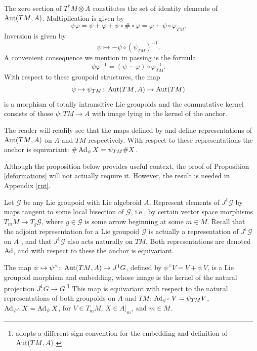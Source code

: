 \documentclass[leqno,12pt]{amsart} %
\newcommand{\varcheck}[1]{{#1^\wedge}} \newcommand{\model}{\automorphism({TM},A)}
\begin{document}
The zero section of $T^*\!M \otimes A$ constitutes the set of identity elements of
$\model$. Multiplication is given by
\begin{equation}
  \label{clost}
  \psi \varphi = \psi + \varphi + \psi \circ \# \circ \varphi = \varphi + \psi \circ \varphi_{TM}.
\end{equation}
Inversion is given by
\begin{equation*}
  \psi \mapsto  -\psi \circ (\psi_{TM})^{-1}.
\end{equation*}
A convenient consequence we mention in passing is the formula
\begin{equation}
  \label{clost2}
  \psi \varphi^{-1} = (\psi - \varphi)\circ \varphi_{TM}^{-1}.
\end{equation}
With respect to these groupoid structures, the map
$$\psi \mapsto \psi_{TM} \colon \model \rightarrow
\automorphism({TM})$$ is a morphism of totally intransitive Lie groupoids and the
commutative kernel consists of those $\psi \colon TM \rightarrow A$ with image lying in
the kernel of the anchor.

The reader will readily see that the maps defined by  and
 define representations of $\model$ on $A$ and $TM$ respectively.
With respect to these representations the anchor is equivariant:
$\#\operatorname{Ad}_\psi X = \psi_{TM}\#X$.

Although the proposition below provides useful context, the proof of Proposition
\ref{deformations} will not actually require it. However, the result is needed in Appendix
\ref{rut}.

Let ${\mathcal G} $ be any Lie groupoid with Lie algebroid $A$. Represent elements of
$J^1 {\mathcal G} $ by maps tangent to some local bisection of ${\mathcal G} $, i.e., by
certain vector space morphisms $T_{m}M \rightarrow T_g {\mathcal G} $, where
$g \in {\mathcal G} $ is some arrow beginning at some $m \in M$. Recall that the adjoint
representation for a Lie groupoid ${\mathcal G} $ is actually a representation of
$J^1 {\mathcal G} $ on $A$ \cite{Blaom_16b}, and that $J^1 {\mathcal G} $ also acts
naturally on $TM$. Both representations are denoted $\operatorname{Ad}$, and with respect to these
the anchor is equivariant.

\begin{proposition}
  The map $\psi \mapsto \varcheck \psi \colon \model \rightarrow J^1 G$, defined by
  $\varcheck \psi V = V + \psi\,V$, is a Lie groupoid morphism and embedding, whose image
  is the kernel of the natural projection $J^1 G \rightarrow G$.\footnote{\cite{Blaom_16b}
    adopts a different sign convention for the embedding and definition of $\model$.} This
  map is equivariant with respect to the natural representations of both groupoids on $A$
  and $TM$: $\Adjoint_{\varcheck\psi} V = \psi_{TM}V$,
  $\Adjoint_{\varcheck\psi} X = \Adjoint_\psi X$, for $V \in {T_{m}M}$, $X \in A|_m$, and
  $m \in M$.
\end{proposition}
\end{document}
